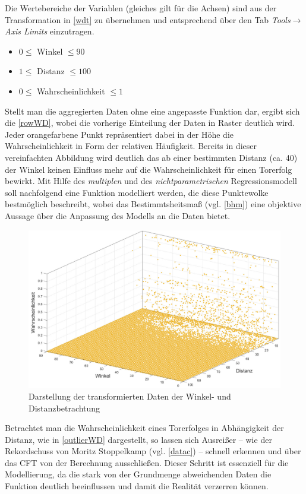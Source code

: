 Die Wertebereiche der Variablen (gleiches gilt für die Achsen) sind aus der Transformation in \vref{wdt} zu übernehmen und entsprechend über den Tab \textit{Tools}$\rightarrow$\textit{Axis Limits} einzutragen.

\begin{itemize}
\item $ 0 \le$ Winkel $\le 90$
\item $ 1 \le$ Distanz $\le 100$
\item $ 0 \le$ Wahrscheinlichkeit $\le 1$
\end{itemize}

Stellt man die aggregierten Daten ohne eine angepasste Funktion dar, ergibt sich die \vref{rowWD}, wobei die vorherige Einteilung der Daten in Raster deutlich wird. Jeder orangefarbene Punkt repräsentiert dabei in der Höhe die Wahrscheinlichkeit in Form der relativen Häufigkeit. Bereits in dieser vereinfachten Abbildung wird deutlich das ab einer bestimmten Distanz (ca. \textsf{40}) der Winkel keinen Einfluss mehr auf die Wahrscheinlichkeit für einen Torerfolg bewirkt. Mit Hilfe des \textit{multiplen} und des \textit{nichtparametrischen} Regressionsmodell soll nachfolgend eine Funktion modelliert werden, die diese Punktewolke bestmöglich beschreibt, wobei das Bestimmtsheitsmaß (vgl. \vref{bhm}) eine objektive Aussage über die Anpassung des Modells an die Daten bietet.

\begin{figure}[H]
\centering
\includegraphics[scale=0.345]{se-wa-jpg/rowWD}
\caption{Darstellung der transformierten Daten der Winkel- und Distanzbetrachtung}
\label{rowWD}
\end{figure}

Betrachtet man die Wahrscheinlichkeit eines Torerfolges in Abhängigkeit der Distanz, wie in \vref{outlierWD} dargestellt, so lassen sich Ausreißer -- wie der Rekordschuss von Moritz Stoppelkamp (vgl. \vref{datac}) -- schnell erkennen und über das CFT von der Berechnung ausschließen. Dieser Schritt ist essenziell für die Modellierung, da die stark von der Grundmenge abweichenden Daten die Funktion deutlich beeinflussen und damit die Realität verzerren können.

